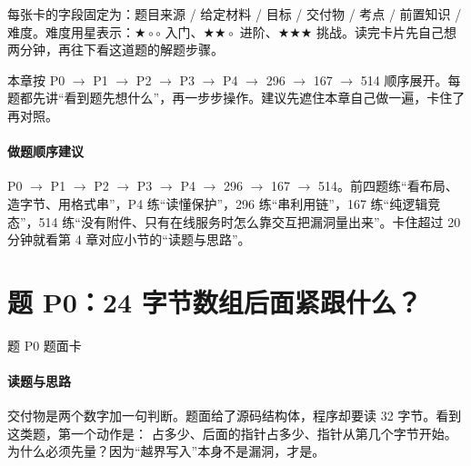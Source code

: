 \documentclass[UTF8,12pt,oneside]{ctexbook}
\begin{document}

每张卡的字段固定为：题目来源 / 给定材料 / 目标 / 交付物 / 考点 / 前置知识 / 难度。难度用星表示：$\bigstar\circ\circ$ 入门、$\bigstar\bigstar\circ$ 进阶、$\bigstar\bigstar\bigstar$ 挑战。读完卡片先自己想两分钟，再往下看这道题的解题步骤。


本章按 P0 $\rightarrow$ P1 $\rightarrow$ P2 $\rightarrow$ P3 $\rightarrow$ P4 $\rightarrow$ 296 $\rightarrow$ 167 $\rightarrow$ 514 顺序展开。每题都先讲“看到题先想什么”，再一步步操作。建议先遮住本章自己做一遍，卡住了再对照。

\paragraph{做题顺序建议}P0 $\rightarrow$ P1 $\rightarrow$ P2 $\rightarrow$ P3 $\rightarrow$ P4 $\rightarrow$ 296 $\rightarrow$ 167 $\rightarrow$ 514。前四题练“看布局、造字节、用格式串”，P4 练“读懂保护”，296 练“串利用链”，167 练“纯逻辑竞态”，514 练“没有附件、只有在线服务时怎么靠交互把漏洞量出来”。卡住超过 20 分钟就看第 4 章对应小节的“读题与思路”。

\section{题 P0：24 字节数组后面紧跟什么？}

\begin{challenge}{题 P0 题面卡}
\end{challenge}

\paragraph{读题与思路}交付物是两个数字加一句判断。题面给了源码结构体，程序却要读 32 字节。看到这类题，第一个动作是： 占多少、后面的指针占多少、指针从第几个字节开始。为什么必须先量？因为“越界写入”本身不是漏洞，才是。
\end{document}
